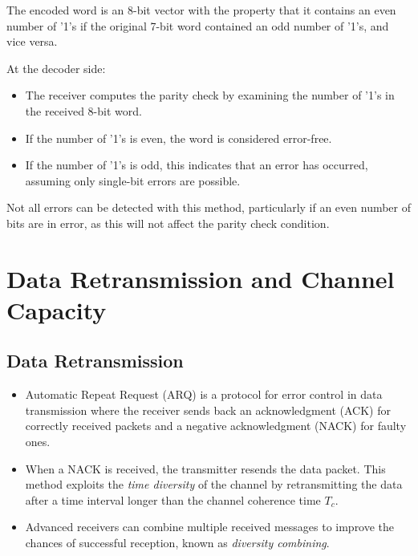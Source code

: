 The encoded word is an 8-bit vector with the property that it contains an even number of '1's if the original 7-bit word contained an odd number of '1's, and vice versa.

At the decoder side:
\begin{itemize}
    \item The receiver computes the parity check by examining the number of '1's in the received 8-bit word.
    \item If the number of '1's is even, the word is considered error-free.
    \item If the number of '1's is odd, this indicates that an error has occurred, assuming only single-bit errors are possible.
\end{itemize}

Not all errors can be detected with this method, particularly if an even number of bits are in error, as this will not affect the parity check condition.


\section*{Data Retransmission and Channel Capacity}

\subsection*{Data Retransmission}
\begin{itemize}
    \item Automatic Repeat Request (ARQ) is a protocol for error control in data transmission where the receiver sends back an acknowledgment (ACK) for correctly received packets and a negative acknowledgment (NACK) for faulty ones.
    \item When a NACK is received, the transmitter resends the data packet. This method exploits the \textit{time diversity} of the channel by retransmitting the data after a time interval longer than the channel coherence time \( T_c \).
    \item Advanced receivers can combine multiple received messages to improve the chances of successful reception, known as \textit{diversity combining}.
\end{itemize}

